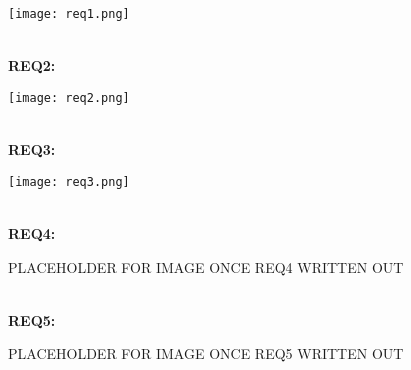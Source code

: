 \texttt{[image: req1.png]}

\textbf{\\REQ2:}

\texttt{[image: req2.png]}

\textbf{\\REQ3:}

\texttt{[image: req3.png]}

\textbf{\\REQ4:}

PLACEHOLDER FOR IMAGE ONCE REQ4 WRITTEN OUT

\textbf{\\REQ5:}

PLACEHOLDER FOR IMAGE ONCE REQ5 WRITTEN OUT











